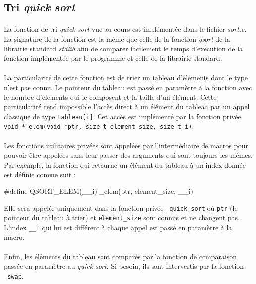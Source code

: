 \documentclass{article}
\begin{document}
    \subsection{Tri \emph{quick sort}}
    \paragraph{}
    La fonction de tri \emph{quick sort} vue au cours est implémentée dans le fichier \emph{sort.c}. La signature de la fonction est la même que celle de la fonction \emph{qsort} de la librairie standard \emph{stdlib} afin de  comparer facilement le temps d'exécution de la fonction implémentée par le programme et celle de la librairie standard.

    \paragraph{}
    La particularité de cette fonction est de trier un tableau d'éléments dont le type n'est pas connu. Le pointeur du tableau est passé en paramètre à la fonction avec le nombre d'éléments qui le composent et la taille d'un élément. Cette particularité rend impossible l'accès direct à un élément du tableau par un appel classique de type \texttt{tableau[i]}. Cet accès est implémenté par la fonction privée \texttt{void *\_elem(void *ptr, size\_t element\_size, size\_t i)}.

    \paragraph{}
    Les fonctions utilitaires privées sont appelées par l'intermédiaire de macros pour pouvoir être appelées sans leur passer des arguments qui sont toujours les mêmes. Par exemple, la fonction qui retourne un élément du tableau à un index donnée est définie comme suit :
    \begin{verbatimtab}
        #define QSORT_ELEM(__i) _elem(ptr, element_size, __i)
    \end{verbatimtab}
    Elle sera appelée uniquement dans la fonction privée \texttt{\_quick\_sort} où \texttt{ptr} (le pointeur du tableau à trier) et \texttt{element\_size} sont connus et ne changent pas. L'index \texttt{\_\_i} qui lui est différent à chaque appel est passé en paramètre à la macro.

    \paragraph{}
    Enfin, les éléments du tableau sont comparés par la fonction de comparaison passée en paramètre au \emph{quick sort}. Si besoin, ils sont intervertis par la fonction \texttt{\_swap}.
\end{document}
